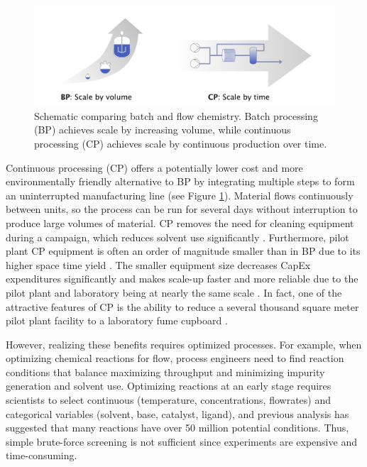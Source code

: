\begin{figure}[bt]
  \includegraphics[height=0.2\textheight]{gfx/Chapter01/scale_up_schematic.png}
  \caption{Schematic comparing batch and flow chemistry. Batch processing (BP) achieves scale by increasing volume, while continuous processing (CP) achieves scale by continuous production over time.}
  \label{batch_v_flow}
\end{figure}

Continuous processing (CP) offers a potentially lower cost and more environmentally friendly alternative to BP by integrating multiple steps to form an uninterrupted manufacturing line (see Figure \ref{batch_v_flow}). Material flows continuously between units, so the process can be run for several days without interruption to produce large volumes of material. CP removes the need for cleaning equipment during a campaign, which reduces solvent use significantly \cite{Lee2016}. Furthermore, pilot plant CP equipment is often an order of magnitude smaller than in BP due to its higher space time yield \cite{Elvira2013}. The smaller equipment size decreases CapEx expenditures significantly \cite{Escriba-Gelonch2019} and makes scale-up faster and more reliable due to the pilot plant and laboratory being at nearly the same scale \cite{Cole2019, Rogers2019}. In fact, one of the attractive features of CP is the ability to reduce a several thousand square meter pilot plant facility to a laboratory fume cupboard \cite{Cole2017, Cole2019}.

However, realizing these benefits requires optimized processes. For example, when optimizing chemical reactions for flow, process engineers need to find reaction conditions that balance maximizing throughput and minimizing impurity generation and solvent use. Optimizing reactions at an early stage requires scientists to select continuous (temperature, concentrations, flowrates) and categorical variables (solvent, base, catalyst, ligand), and previous analysis has suggested that many reactions have over 50 million potential conditions. Thus, simple brute-force screening is not sufficient since experiments are expensive and time-consuming.

